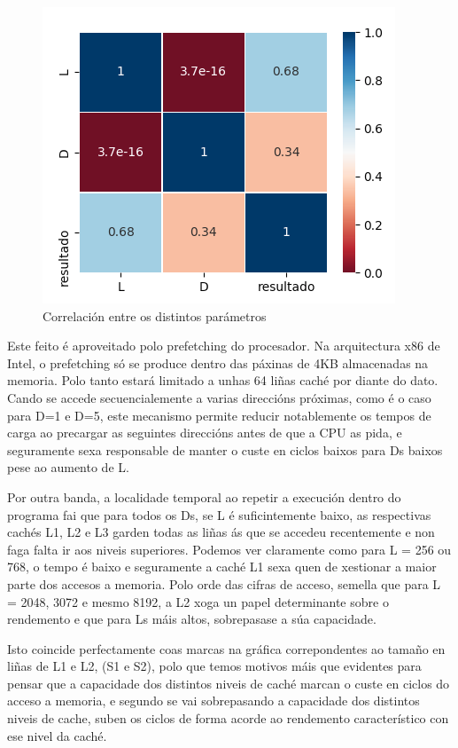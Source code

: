 \documentclass[letterpaper, 10 pt,spanish, conference]{ieeeconf}  %
\begin{document}
\begin{figure}
  \includegraphics[width=0.7\linewidth]{corr3_3.png}
  \centering
  \caption{Correlación entre os distintos parámetros}
  \label{fig:corr}
\end{figure}
Este feito é aproveitado polo prefetching do procesador. Na arquitectura x86 de Intel, o prefetching só se produce dentro das páxinas de 4KB almacenadas na memoria. Polo tanto estará limitado a unhas 64 liñas caché por diante do dato. Cando se accede secuencialemente a varias direccións próximas, como é o caso para D=1 e D=5, este mecanismo permite reducir notablemente os tempos de carga ao precargar as seguintes direccións antes de que a CPU as pida, e seguramente sexa responsable de manter o custe en ciclos baixos para Ds baixos pese ao aumento de L. 

Por outra banda, a localidade temporal ao repetir a execución dentro do programa fai que para todos os Ds, se L é suficintemente baixo, as respectivas cachés L1, L2 e L3 garden todas as liñas ás que se accedeu recentemente e non faga falta ir aos niveis superiores. Podemos ver claramente como para L = 256 ou 768, o tempo é baixo e seguramente a caché L1 sexa quen de xestionar a maior parte dos accesos a memoria. Polo orde das cifras de acceso, semella que para L = 2048, 3072 e mesmo 8192, a L2 xoga un papel determinante sobre o rendemento e que para Ls máis altos, sobrepasase a súa capacidade.

Isto coincide perfectamente coas marcas na gráfica correpondentes ao tamaño en liñas de L1 e L2, (S1 e S2), polo que temos motivos máis que evidentes para pensar que a capacidade dos distintos niveis de caché marcan o custe en ciclos do acceso a memoria, e segundo se vai sobrepasando a capacidade dos distintos niveis de cache, suben os ciclos de forma acorde ao rendemento característico con ese nivel da caché.
\end{document}
